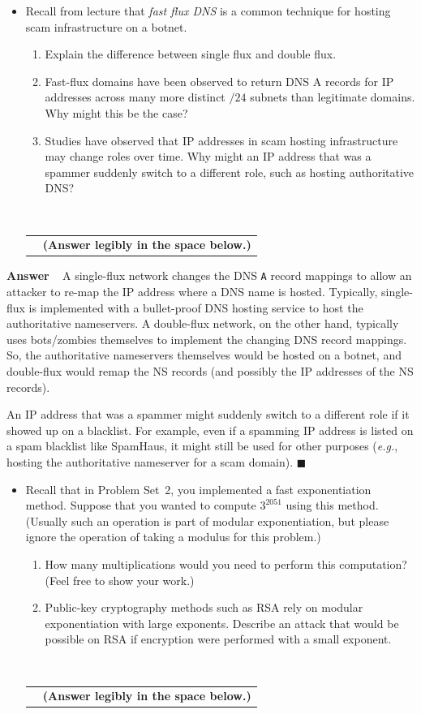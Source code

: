 \documentclass[11pt]{article}
\newcounter{pctr}
\newcommand{\eg}{{\em e.g.}}
\newcommand{\ansbelow}{\probnote{Answer legibly in the space below.}}
\newcommand{\sols}[1]{#1}
\newcommand{\sols}[1]{}
\newcounter{answer}
\newenvironment{answer}[1][\relax]{\refstepcounter{answer}\begin{list}%
 {}{\leftmargin 0pt\rightmargin 0pt\labelsep 3pt\parsep 0pt%
 \setlength{\listparindent}{\parindent}}
    \item {\bf Answer \theanswer #1}\
    }{\hspace*{\fill}$\blacksquare$\end{list}}
\newcommand\prob[1]%
  {\begin{itemize}\item[]%
   \vspace{.2in}{\bf\thepctr. ~[#1~ points]:}\stepcounter{pctr}}
\newcommand\eprob{\end{itemize}}
\newcommand\probnote[1]%
  {\\\begin{tabular}{cr} \hspace{3in} & {\bf (#1)} \\ \end{tabular}}
\begin{document}
\newpage
\prob{6} Recall from lecture that {\em fast flux DNS} is a common
technique for hosting scam infrastructure on a botnet.
\begin{enumerate}
\item Explain the difference between single flux and double flux.
\item Fast-flux domains have been observed to return DNS A records
for IP addresses across many more distinct $/24$ subnets than legitimate
domains.  Why might this be the case?  
\item Studies have observed that IP addresses in scam hosting
  infrastructure may change roles over time.  Why might an IP address
  that was a spammer suddenly switch to a different role, such as
  hosting authoritative DNS?
\end{enumerate}
~\ansbelow
\vspace{1.25in}
\eprob

\sols{
\vspace{-1.25in}
\begin{answer}
A single-flux network changes the DNS {\tt A} record mappings to allow
an attacker to re-map the IP address where a DNS name is hosted.
Typically, single-flux is implemented with a bullet-proof DNS hosting
service to host the authoritative nameservers.  A double-flux network,
on the other hand, typically uses bots/zombies themselves to implement
the changing DNS record mappings.  So, the authoritative nameservers
themselves would be hosted on a botnet, and double-flux would remap the
NS records (and possibly the IP addresses of the NS records).

An IP address that was a spammer might suddenly switch to a different
role if it showed up on a blacklist.  For example, even if a spamming IP
address is listed on a spam blacklist like SpamHaus, it might still be
used for other purposes (\eg, hosting the authoritative nameserver for a
scam domain).
\end{answer}
}


\prob{6} Recall that in Problem Set~2, you implemented a fast
exponentiation method.  Suppose that you wanted to compute $3^{2051}$
using this method. (Usually such an operation is part of modular
exponentiation, but please ignore the operation of taking a modulus for
this problem.)   
\begin{enumerate}
\item How many multiplications would you need to perform
this computation? (Feel free to show your work.)
\item Public-key cryptography methods such as RSA rely on modular
  exponentiation with large exponents.  Describe an attack that would be
  possible on RSA if encryption were performed with a small exponent.
\end{enumerate}
  ~\ansbelow
\vspace{1.25in}
\eprob
\end{document}
